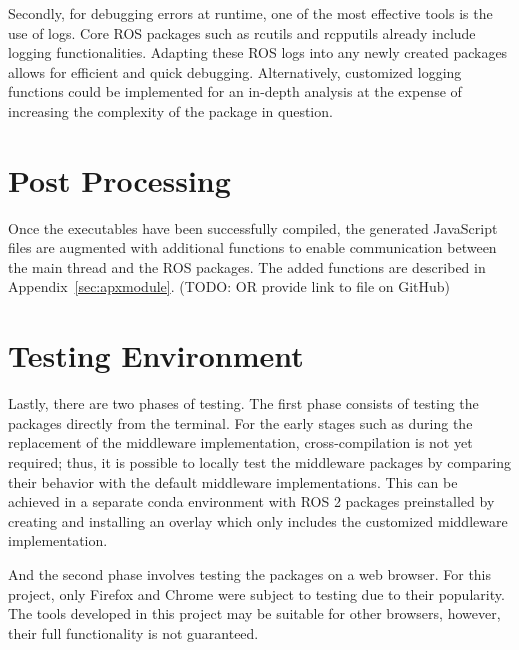     Secondly, for debugging errors at runtime, one of the most effective tools is the use of logs. Core \ac{ROS} packages such as \textsf{rcutils} and \textsf{rcpputils} already include logging functionalities. Adapting these \ac{ROS} logs into any newly created packages allows for efficient and quick debugging. Alternatively, customized logging functions could be implemented for an in-depth analysis at the expense of increasing the complexity of the package in question.

\section{Post Processing}

    Once the executables have been successfully compiled, the generated JavaScript files are augmented with additional functions to enable communication between the main thread and the ROS packages. The added functions are described in Appendix~\ref{sec:apxmodule}. (TODO: OR provide link to file on GitHub)

\section{Testing Environment}

    Lastly, there are two phases of testing. The first phase consists of testing the packages directly from the terminal. For the early stages such as during the replacement of the middleware implementation, cross-compilation is not yet required; thus, it is possible to locally test the middleware packages by comparing their behavior with the default middleware implementations. This can be achieved in a separate \textsf{conda} environment with \ac{ROS} 2 packages preinstalled by creating and installing an overlay which only includes the customized middleware implementation.

    And the second phase involves testing the packages on a web browser. For this project, only Firefox and Chrome were subject to testing due to their popularity. The tools developed in this project may be suitable for other browsers, however, their full functionality is not guaranteed.
